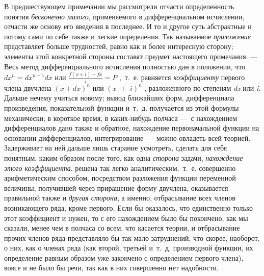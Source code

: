 В предшествующем примечании мы рассмотрели отчасти определенность понятия
{\em бесконечно малого}, применяемого в дифференциальном
исчислении, отчасти же основу его введения в последнее. И то и другое суть
абстрактные и потому сами по себе также и легкие определения. Так
называемое {\em приложение} представляет больше
трудностей, равно как и более интересную сторону; элементы этой конкретной
стороны составят предмет настоящего примечания. — Весь метод
дифференциального исчисления полностью дан в положении, что 
$\mathit{dx}^n=\mathit{dx}^{n-1}\mathit{dx}$  или 
$\frac{f\left(x+i\right)-\mathit{fx}} i=P$ ,~т.~е. равняется
{\em коэффициенту} первого члена двучлена 
$(x+\mathit{dx})^n$  или  $(x\text{~}+\text{~}i)^n$
, разложенного по степеням {\em dx} или {\em i}. Дальше нечему
учиться новому; вывод ближайших форм, дифференциала произведения,
показательной функции и~т.~д. получается из этой формулы механически; в
короткое время, в каких-нибудь полчаса —~с нахождением дифференциалов дано
также и обратное, нахождение первоначальной функции на основании
дифференциалов, интегрирование —~можно овладеть всей теорией. Задерживает на
ней дальше лишь старание усмотреть, сделать для себя понятным, каким
образом после того, как одна {\em сторона} задачи,
{\em нахождение этого коэффициента}, решена так легко
аналитическим,~т.~е. совершенно арифметическим способом, посредством
разложения функции переменной величины, получившей через приращение форму
двучлена, оказывается правильной также и {\em другая
сторона}, а именно, отбрасывание всех членов возникающего ряда, кроме
первого. Если бы оказалось, что единственно только этот коэффициент и нужен,
то с его нахождением было бы покончено, как мы сказали, менее чем в полчаса
со всем, что касается теории, и отбрасывание прочих членов ряда
представляло бы так мало затруднений, что скорее, наоборот, о них, как о
членах ряда (как второй, третьей и~т.~д. производной функции, их
определение равным образом уже закончено с определением первого члена),
вовсе и не было бы речи, так как в них совершенно нет надобности.

